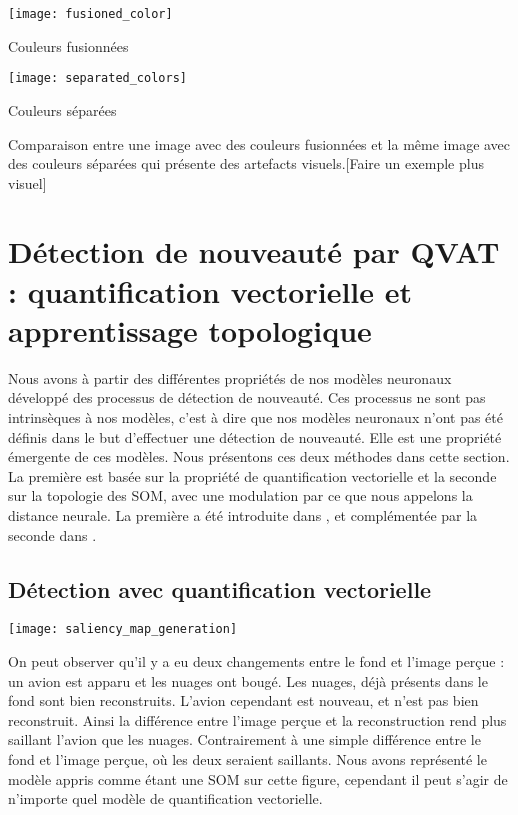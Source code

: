 	\begin{figureth}
		\begin{subfigureth}{0.48\textwidth}
			\texttt{[image: fusioned\_color]}\caption{Couleurs fusionnées}	
		\end{subfigureth}
		\begin{subfigureth}{0.48\textwidth}
			\texttt{[image: separated\_colors]}\caption{Couleurs séparées}	
		\end{subfigureth}
		\caption[Représentation d'une image]{Comparaison entre une image avec des couleurs fusionnées et la même image avec des couleurs séparées qui présente des artefacts visuels.[Faire un exemple plus visuel]}\label{fig:img:rep}
	\end{figureth}

	\newpage
	\section{Détection de nouveauté par QVAT : quantification vectorielle et apprentissage topologique}

	Nous avons à partir des différentes propriétés de nos modèles neuronaux développé des processus de détection de nouveauté. Ces processus ne sont pas intrinsèques à nos modèles, c'est à dire que nos modèles neuronaux n'ont pas été définis dans le but d'effectuer une détection de nouveauté. Elle est une propriété émergente de ces modèles. Nous présentons ces deux méthodes dans cette section. La première est basée sur la propriété de quantification vectorielle et la seconde sur la topologie des SOM, avec une modulation par ce que nous appelons la distance neurale. La première a été introduite dans \cite{bernard2019novelty}, et complémentée par la seconde dans \cite{bernard2020novelty}.

	\subsection{Détection avec quantification vectorielle}

	\begin{figureth}
		\texttt{[image: saliency\_map\_generation]}
		\caption[Détection de nouveauté par quantification vectorielle]{On peut observer qu'il y a eu deux changements entre le fond et l'image perçue : un avion est apparu et les nuages ont bougé. Les nuages, déjà présents dans le fond sont bien reconstruits. L'avion cependant est nouveau, et n'est pas bien reconstruit. Ainsi la différence entre l'image perçue et la reconstruction rend plus saillant l'avion que les nuages. Contrairement à une simple différence entre le fond et l'image perçue, où les deux seraient saillants. Nous avons représenté le modèle appris comme étant une SOM sur cette figure, cependant il peut s'agir de n'importe quel modèle de quantification vectorielle.}\label{fig:img:vq}
	\end{figureth}

